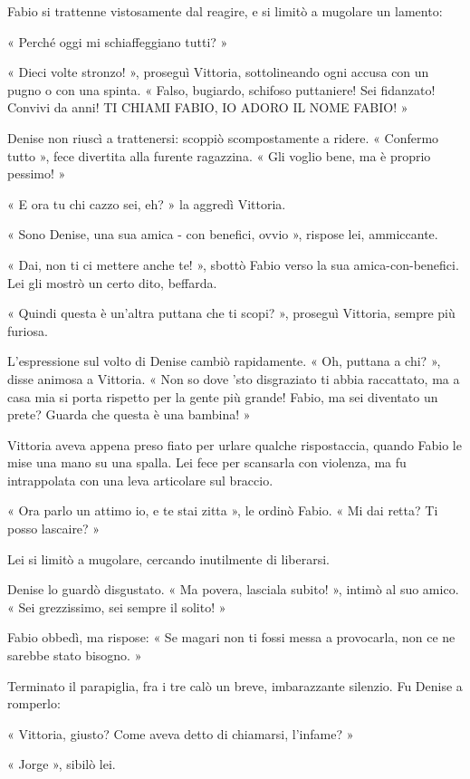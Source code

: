 Fabio si trattenne vistosamente dal reagire, e si limitò a mugolare un lamento:

« Perché oggi mi schiaffeggiano tutti? »

« Dieci volte stronzo! », proseguì Vittoria, sottolineando ogni accusa con un pugno o con una spinta. « Falso, bugiardo, schifoso puttaniere! Sei fidanzato! Convivi da anni! TI CHIAMI FABIO, IO ADORO IL NOME FABIO! »

Denise non riuscì a trattenersi: scoppiò scompostamente a ridere. « Confermo tutto », fece divertita alla furente ragazzina. « Gli voglio bene, ma è proprio pessimo! »

« E ora tu chi cazzo sei, eh? » la aggredì Vittoria.

« Sono Denise, una sua amica - con benefici, ovvio », rispose lei, ammiccante.

« Dai, non ti ci mettere anche te! », sbottò Fabio verso la sua amica-con-benefici. Lei gli mostrò un certo dito, beffarda.

« Quindi questa è un'altra puttana che ti scopi? », proseguì Vittoria, sempre più furiosa.

L'espressione sul volto di Denise cambiò rapidamente. « Oh, puttana a chi? », disse animosa a Vittoria. « Non so dove 'sto disgraziato ti abbia raccattato, ma a casa mia si porta rispetto per la gente più grande! Fabio, ma sei diventato un prete? Guarda che questa è una bambina! »

Vittoria aveva appena preso fiato per urlare qualche rispostaccia, quando Fabio le mise una mano su una spalla. Lei fece per scansarla con violenza, ma fu intrappolata con una leva articolare sul braccio.

« Ora parlo un attimo io, e te stai zitta », le ordinò Fabio. « Mi dai retta? Ti posso lascaire? »

Lei si limitò a mugolare, cercando inutilmente di liberarsi.

Denise lo guardò disgustato. « Ma povera, lasciala subito! », intimò al suo amico. « Sei grezzissimo, sei sempre il solito! »

Fabio obbedì, ma rispose: « Se magari non ti fossi messa a provocarla, non ce ne sarebbe stato bisogno. »

Terminato il parapiglia, fra i tre calò un breve, imbarazzante silenzio. Fu Denise a romperlo:

« Vittoria, giusto? Come aveva detto di chiamarsi, l'infame? »

« Jorge », sibilò lei.

